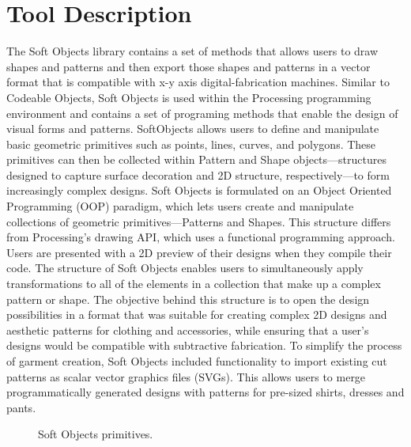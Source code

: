 \section{Tool Description}
The Soft Objects library contains a set of methods that allows users to draw shapes and patterns and then export those shapes and patterns in a vector format that is compatible with x-y axis digital-fabrication machines. Similar to Codeable Objects, Soft Objects is used within the Processing programming environment and contains a set of programing methods that enable the design of visual forms and patterns. SoftObjects allows users to define and manipulate basic geometric primitives such as points, lines, curves, and polygons. These primitives can then be collected within Pattern and Shape objects---structures designed to capture surface decoration and 2D structure, respectively---to form increasingly complex designs. Soft Objects is formulated on an Object Oriented Programming (OOP) paradigm, which lets users create and manipulate collections of geometric primitives---Patterns and Shapes. This structure differs from Processing's drawing API, which uses a functional programming approach. Users are presented with a 2D preview of their designs when they compile their code. The structure of Soft Objects enables users to simultaneously apply transformations to all of the elements in a collection that make up a complex pattern or shape. The objective behind this structure is to open the design possibilities in a format that was suitable for creating complex 2D designs and aesthetic patterns for clothing and accessories, while ensuring that a user's designs would be compatible with subtractive fabrication. To simplify the process of garment creation, Soft Objects included functionality to import existing cut patterns as scalar vector graphics files (SVGs). This allows users to merge programmatically generated designs with patterns for pre-sized shirts, dresses and pants.

\begin{center}
\begin{figure}[h!]
\caption{Soft Objects primitives.}
\label{fig:softobjects_primitives}
\end{figure}
\end{center}
		
